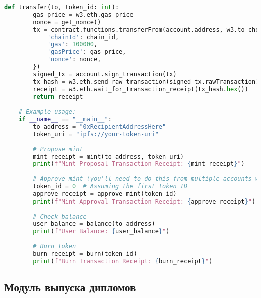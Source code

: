 \begin{lstlisting}[language=Python, caption=Тесты умного контракта]
    def transfer(to, token_id: int):
        gas_price = w3.eth.gas_price
        nonce = get_nonce()
        tx = contract.functions.transferFrom(account.address, w3.to_checksum_address(to), token_id).build_transaction({
            'chainId': chain_id,
            'gas': 100000,
            'gasPrice': gas_price,
            'nonce': nonce,
        })
        signed_tx = account.sign_transaction(tx)
        tx_hash = w3.eth.send_raw_transaction(signed_tx.rawTransaction)
        receipt = w3.eth.wait_for_transaction_receipt(tx_hash.hex())
        return receipt
    
    # Example usage:
    if __name__ == "__main__":
        to_address = "0xRecipientAddressHere"
        token_uri = "ipfs://your-token-uri"
        
        # Propose mint
        mint_receipt = mint(to_address, token_uri)
        print(f"Mint Proposal Transaction Receipt: {mint_receipt}")
    
        # Approve mint (you'll need to do this from multiple accounts with MULTISIG_ROLE)
        token_id = 0  # Assuming the first token ID
        approve_receipt = approve_mint(token_id)
        print(f"Mint Approval Transaction Receipt: {approve_receipt}")
    
        # Check balance
        user_balance = balance(to_address)
        print(f"User Balance: {user_balance}")
    
        # Burn token
        burn_receipt = burn(token_id)
        print(f"Burn Transaction Receipt: {burn_receipt}")    
\end{lstlisting}

\subsection{Модуль выпуска дипломов}

